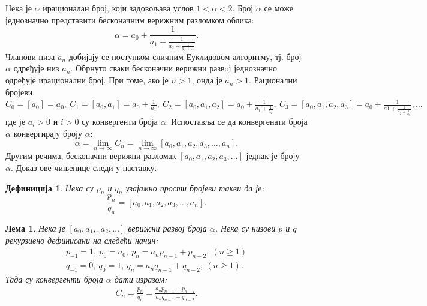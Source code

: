\documentclass[a4paper]{article}
\newtheorem{lemma}{Лема}
\newtheorem{definition}{Дефиниција}
\begin{document}
Нека је $ \alpha $ ирационалан број, који задовољава услов $ 1 < \alpha < 2 $. Број $ \alpha $ се може једнозначно представити бесконачним верижним разломком облика:
\begin{displaymath}
	\alpha = a_{0} + \frac{1}{a_{1} + \frac{1}{a_{2} + \frac{1}{a_{3} + \ldots}}}.
\end{displaymath}
Чланови низа $ a_{n} $ добијају се поступком сличним Еуклидовом алгоритму, тј. број $ \alpha $ одређује низ $ a_{n} $. Обрнуто сваки бесконачни верижни развoј једнозначно одређује ирационални број. При томе, ако је $ n > 1 $, онда је $ a_{n} > 1 $.
Рационални бројеви $ C_{0} = [a_{0}] = a_{0},\ C_{1} = [a_{0}, a_{1}] = a_{0} + \frac{1}{a_{1}},\ C_{2} = [a_{0}, a_{1}, a_{2}] = a_{0} + \frac{1}{a_{1} + \frac{1}{a_{2}}},\ C_{3} = [a_{0}, a_{1}, a_{2}, a_{3}] = a_{0} + \frac{1}{a{1} + \frac{1}{a_{2} + \frac{1}{a_{3}}}}, \ldots $ где је $ a_{i} > 0 $ и $ i > 0 $ су конвергенти броја $ \alpha $.
Испоставља се да конвергенати броја $ \alpha $ конвергирају броју $ \alpha $:
\begin{displaymath}
	\alpha = \lim\limits_{n \rightarrow \infty} C_{n} = \lim\limits_{n \rightarrow \infty} [a_{0}, a_{1}, a_{2}, a_{3}, \ldots, a_{n}].
\end{displaymath}
Другим речима, бесконачни верижни разломак $ [a_{0}, a_{1}, a_{2}, a_{3}, \ldots] $ једнак је броју $ \alpha $. Доказ ове чињенице следи у наставку.

\begin{definition}
	\label{def:p_q_nizovi}
	Нека су $ p_{n} $ и $ q_{n} $ узајамно прости бројеви такви да је:
	\begin{displaymath}
		\frac{p_{n}}{q_{n}} = [a_{0}, a_{1}, a_{2}, a_{3}, \ldots, a_{n}].
	\end{displaymath}	
\end{definition}

\begin{lemma}
	\label{lemmma:p_q_nizovi}
	Нека је $ [a_{0}, a_{1}, , a_{2}, \ldots] $ верижни развој броја $ \alpha $. Нека су низови $ p $ и $ q $ рекурзивно дефинисани на следећи начин:	
	\begin{eqnarray}
		p_{-1} = 1,\ p_{0} = a_{0},\ p_{n} = a_{n}p_{n-1} + p_{n-2},\ (n \geq 1 )\\
		q_{-1} = 0,\ q_{0} = 1,\ q_{n} = a_{n}q_{n-1} + q_{n-2},\ (n \geq 1 ).
	\end{eqnarray}
	Тада су конвергенти броја $ \alpha $ дати изразом:	
	\begin{eqnarray}
		C_{n} = \frac{p_{n}}{q_{n}} = \frac{a_{n}p_{n-1} + p_{n-2}}{a_{n}q_{n-1} + q_{n-2}}.
	\end{eqnarray}
\end{lemma}
\end{document}
